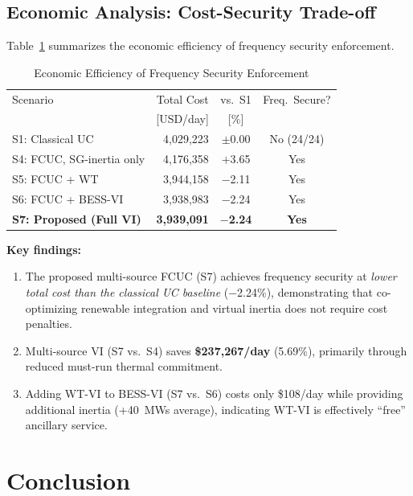 \documentclass[journal]{IEEEtran}
\begin{document}
\subsection{Economic Analysis: Cost-Security Trade-off}

Table~\ref{tab:econ} summarizes the economic efficiency of
frequency security enforcement.

\begin{table}[!t]
\renewcommand{\arraystretch}{1.2}
\caption{Economic Efficiency of Frequency Security Enforcement}
\label{tab:econ}
\centering\footnotesize
\begin{tabular}{lrcc}
\toprule
Scenario & Total Cost & vs.\ S1 & Freq.\ Secure? \\
         & [USD/day]  & [\%]    & \\
\midrule
S1: Classical UC           & 4{,}029{,}223 & $\pm$0.00 & No (24/24) \\
S4: FCUC, SG-inertia only  & 4{,}176{,}358 & $+$3.65   & Yes \\
S5: FCUC + WT              & 3{,}944{,}158 & $-$2.11   & Yes \\
S6: FCUC + BESS-VI         & 3{,}938{,}983 & $-$2.24   & Yes \\
\textbf{S7: Proposed (Full VI)} & \textbf{3{,}939{,}091} & $\mathbf{-}$\textbf{2.24}
  & \textbf{Yes} \\
\bottomrule
\end{tabular}
\end{table}

\textbf{Key findings:}
\begin{enumerate}
  \item The proposed multi-source FCUC (S7) achieves frequency
    security at \emph{lower total cost than the classical UC
    baseline} ($-$2.24\%), demonstrating that co-optimizing
    renewable integration and virtual inertia does not require
    cost penalties.

  \item Multi-source VI (S7 vs.\ S4) saves \textbf{\$237{,}267/day}
    (5.69\%), primarily through reduced must-run thermal commitment.

  \item Adding WT-VI to BESS-VI (S7 vs.\ S6) costs only \$108/day
    while providing additional inertia (+40~MWs average), indicating
    WT-VI is effectively ``free'' ancillary service.
\end{enumerate}

\section{Conclusion}
\label{sec:conclusion}
\end{document}
